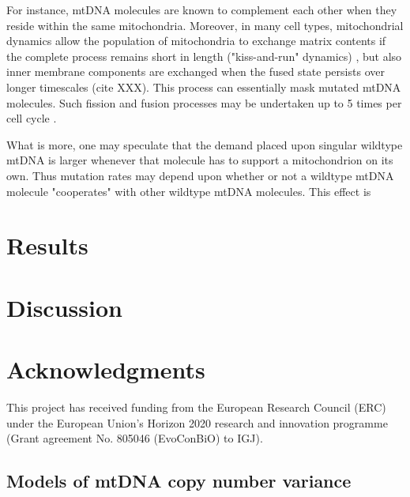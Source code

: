 \documentclass[12pt]{article}
\begin{document}
For instance, mtDNA molecules are known to complement each other when they reside within the same mitochondria. Moreover, in many cell types, mitochondrial dynamics allow the population of mitochondria to exchange matrix contents if the complete process remains short in length ("kiss-and-run" dynamics) \citep{logan2010dynamic}, but also inner membrane components are exchanged when the fused state persists over longer timescales (cite XXX). This process can essentially mask mutated mtDNA molecules. Such fission and fusion processes may be undertaken up to 5 times per cell cycle \citep{twig2008mitochondrial}.

What is more, one may speculate that the demand placed upon singular wildtype mtDNA is larger whenever that molecule has to support a mitochondrion on its own. Thus mutation rates may depend upon whether or not a wildtype mtDNA molecule "cooperates" with other wildtype mtDNA molecules. This effect is

\section*{Results}

\section*{Discussion}

\section*{Acknowledgments}
This project has received funding from the European Research Council (ERC) under the European Union's Horizon 2020 research and innovation programme (Grant agreement No. 805046 (EvoConBiO) to IGJ).



\clearpage
\newpage

\begin{appendices}
\section{Models of mtDNA copy number variance}

\end{appendices}
\end{document}
